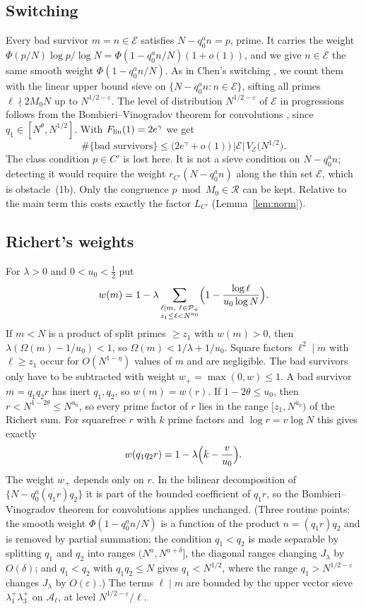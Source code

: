 \documentclass[11pt]{amsart}
\theoremstyle{remark}
\newcommand{\e}{\varepsilon}
\newcommand{\cA}{\mathcal A}
\newcommand{\cE}{\mathcal E}
\newcommand{\cP}{\mathcal P}
\begin{document}
\subsection{Switching}
Every bad survivor $m=n\in\cE$ satisfies $N-q_0^an=p$, prime. It carries the weight $\Phi(p/N)\log p/\log N=\Phi(1-q_0^an/N)(1+o(1))$, and we give $n\in\cE$ the same smooth weight $\Phi(1-q_0^an/N)$. As in Chen's switching \cite{Chen73}, we count them with the linear upper bound sieve on $\{N-q_0^an:n\in\cE\}$, sifting all primes $\ell\nmid 2M_0N$ up to $N^{1/2-\e}$. The level of distribution $N^{1/2-\e}$ of $\cE$ in progressions follows from the Bombieri--Vinogradov theorem for convolutions \cite{Motohashi,BFI1}, since $q_1\in[N^\theta,N^{1/2}]$. With $F_{\rm lin}(1)=2e^\gamma$ we get
\begin{equation}\label{eq:switch}
\#\{\text{bad survivors}\}\le\bigl(2e^{\gamma}+o(1)\bigr)\,|\cE|\,V_{\cE}\bigl(N^{1/2}\bigr) .
\end{equation}
The class condition $p\in C'$ is lost here. It is not a sieve condition on $N-q_0^an$; detecting it would require the weight $r_{C'}(N-q_0^an)$ along the thin set $\cE$, which is obstacle~(1b). Only the congruence $p\bmod M_0\in\mathcal R$ can be kept. Relative to the main term this costs exactly the factor $L_{C'}$ (Lemma~\ref{lem:norm}).

\subsection{Richert's weights}
For $\lambda>0$ and $0<u_0<\frac12$ put
\[
w(m)=1-\lambda\sum_{\substack{\ell\mid m,\ \ell\in\cP_+\\ z_1\le\ell<N^{u_0}}}\Bigl(1-\frac{\log\ell}{u_0\log N}\Bigr).
\]
If $m<N$ is a product of split primes $\ge z_1$ with $w(m)>0$, then $\lambda(\Omega(m)-1/u_0)<1$, so $\Omega(m)<1/\lambda+1/u_0$. Square factors $\ell^2\mid m$ with $\ell\ge z_1$ occur for $O(N^{1-\eta})$ values of $m$ and are negligible. The bad survivors only have to be subtracted with weight $w_+=\max(0,w)\le1$. A bad survivor $m=q_1q_2r$ has inert $q_1,q_2$, so $w(m)=w(r)$. If $1-2\theta\le u_0$, then $r<N^{1-2\theta}\le N^{u_0}$, so every prime factor of $r$ lies in the range $[z_1,N^{u_0})$ of the Richert sum. For squarefree $r$ with $k$ prime factors and $\log r=v\log N$ this gives exactly
\begin{equation}\label{eq:wr}
w(q_1q_2r)=1-\lambda\Bigl(k-\frac v{u_0}\Bigr).
\end{equation}
The weight $w_+$ depends only on $r$. In the bilinear decomposition of $\{N-q_0^a(q_1r)q_2\}$ it is part of the bounded coefficient of $q_1r$, so the Bombieri--Vinogradov theorem for convolutions applies unchanged. (Three routine points: the smooth weight $\Phi(1-q_0^an/N)$ is a function of the product $n=(q_1r)q_2$ and is removed by partial summation; the condition $q_1<q_2$ is made separable by splitting $q_1$ and $q_2$ into ranges $(N^{a},N^{a+\delta}]$, the diagonal ranges changing $J_\lambda$ by $O(\delta)$; and $q_1<q_2$ with $q_1q_2\le N$ gives $q_1<N^{1/2}$, where the range $q_1>N^{1/2-\e}$ changes $J_\lambda$ by $O(\e)$.) The terms $\ell\mid m$ are bounded by the upper vector sieve $\lambda_1^+\lambda_3^+$ on $\cA_\ell$, at level $N^{1/2-\e}/\ell$.
\end{document}
